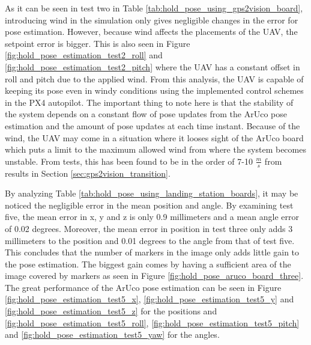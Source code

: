 \documentclass[../Head/report.tex]{subfiles}
\begin{document}
As it can be seen in test two in Table \ref{tab:hold_pose_using_gps2vision_board}, introducing wind in the simulation only gives negligible changes in the error for pose estimation. However, because wind affects the placements of the UAV, the setpoint error is bigger. This is also seen in Figure \ref{fig:hold_pose_estimation_test2_roll} and \ref{fig:hold_pose_estimation_test2_pitch} where the UAV has a constant offset in roll and pitch due to the applied wind. From this analysis, the UAV is capable of keeping its pose even in windy conditions using the implemented control schemes in the PX4 autopilot. The important thing to note here is that the stability of the system depends on a constant flow of pose updates from the ArUco pose estimation and the amount of pose updates at each time instant. Because of the wind, the UAV may come in a situation where it looses sight of the ArUco board which puts a limit to the maximum allowed wind from where the system becomes unstable. From tests, this has been found to be in the order of 7-10 $\frac{m}{s}$ from results in Section \ref{sec:gps2vision_transition}. 

By analyzing Table \ref{tab:hold_pose_using_landing_station_boards}, it may be noticed the negligible error in the mean position and angle. By examining test five, the mean error in x, y and z is only 0.9 millimeters and a mean angle error of 0.02 degrees. Moreover, the mean error in position in test three only adds 3 millimeters to the position and 0.01 degrees to the angle from that of test five. This concludes that the number of markers in the image only adds little gain to the pose estimation. The biggest gain comes by having a sufficient area of the image covered by markers as seen in Figure \ref{fig:hold_pose_aruco_board_three}. The great performance of the ArUco pose estimation can be seen in Figure \ref{fig:hold_pose_estimation_test5_x}, \ref{fig:hold_pose_estimation_test5_y} and \ref{fig:hold_pose_estimation_test5_z} for the positions and \ref{fig:hold_pose_estimation_test5_roll}, \ref{fig:hold_pose_estimation_test5_pitch} and \ref{fig:hold_pose_estimation_test5_yaw} for the angles. 
\end{document}
